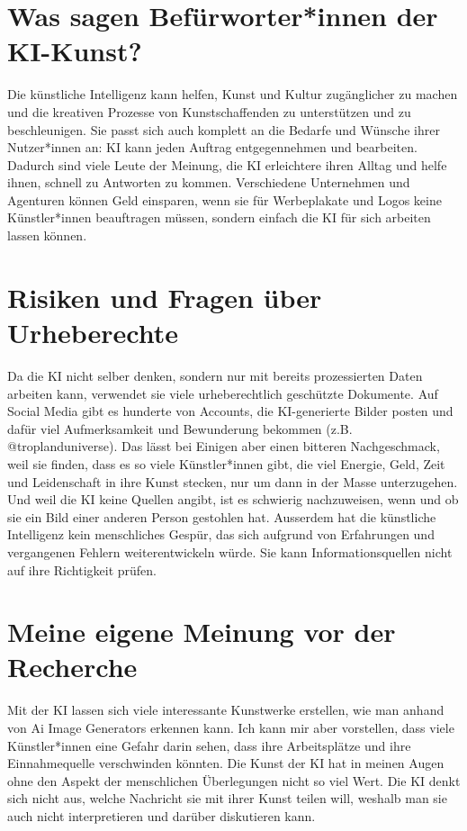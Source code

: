 \documentclass{article}
\begin{document}
\section{Was sagen Befürworter*innen der KI-Kunst?}
    Die künstliche Intelligenz kann helfen, Kunst und Kultur zugänglicher zu machen und die kreativen 
    Prozesse von Kunstschaffenden zu unterstützen und zu beschleunigen.  Sie passt sich auch komplett an die Bedarfe und Wünsche ihrer Nutzer*innen an: KI kann jeden Auftrag entgegennehmen und bearbeiten. Dadurch sind viele Leute der Meinung, die KI erleichtere ihren Alltag und helfe ihnen, schnell zu Antworten zu kommen.
    \newline Verschiedene Unternehmen und Agenturen können Geld einsparen, wenn sie für Werbeplakate und Logos keine Künstler*innen beauftragen müssen, sondern einfach die KI für sich arbeiten lassen können.
    
\section{Risiken und Fragen über Urheberechte}
    Da die KI nicht selber denken, sondern nur mit bereits prozessierten Daten arbeiten kann, verwendet sie viele urheberechtlich geschützte Dokumente. Auf Social Media gibt es hunderte von Accounts, die KI-generierte Bilder posten und dafür viel Aufmerksamkeit und Bewunderung bekommen (z.B. @troplanduniverse). Das lässt bei Einigen aber einen bitteren Nachgeschmack, weil sie finden, dass es so viele Künstler*innen gibt, die viel Energie, Geld, Zeit und Leidenschaft in ihre Kunst stecken, nur um dann in der Masse unterzugehen. Und weil die KI keine Quellen angibt, ist es schwierig nachzuweisen, wenn und ob sie ein Bild einer anderen Person gestohlen hat.
    \newline Ausserdem hat die künstliche Intelligenz kein menschliches Gespür, das sich aufgrund von Erfahrungen und vergangenen Fehlern weiterentwickeln würde. Sie kann Informationsquellen nicht auf ihre Richtigkeit prüfen.

\section{Meine eigene Meinung vor der Recherche}
    Mit der KI lassen sich viele interessante Kunstwerke erstellen, wie man anhand von Ai Image 
    Generators erkennen kann. Ich kann mir aber vorstellen, dass viele Künstler*innen eine Gefahr 
    darin sehen, dass ihre Arbeitsplätze und ihre Einnahmequelle verschwinden könnten. Die Kunst der KI 
    hat in meinen Augen ohne den Aspekt der menschlichen Überlegungen nicht so viel Wert. Die KI denkt 
    sich nicht aus, welche Nachricht sie mit ihrer Kunst teilen will, weshalb man sie auch nicht 
    interpretieren und darüber diskutieren kann.
\end{document}
